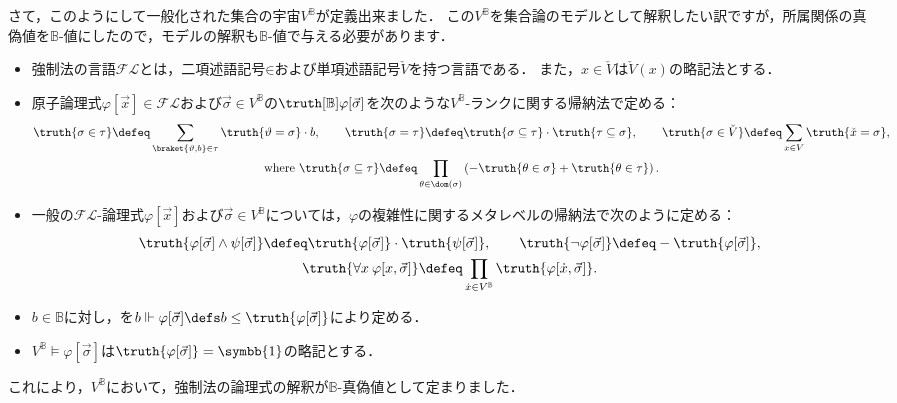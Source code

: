 \documentclass[a4j]{ltjsarticle}
\newcommand{\mathds}[1]{\symbb{#1}}
\renewcommand{\emph}[1]{\textbf{\textgt{#1}}}
\newcommand{\FL}{\mathord{\mathcal{F\!L}}}
\begin{document}
さて，このようにして一般化された集合の宇宙$V^{\mathbb{B}}$が定義出来ました．
この$V^{\mathbb{B}}$を集合論のモデルとして解釈したい訳ですが，所属関係の真偽値を$\mathbb{B}$-値にしたので，モデルの解釈も$\mathbb{B}$-値で与える必要があります．

\begin{definition}
 \begin{itemize}
  \item 強制法の言語$\FL$とは，二項述語記号$\mathord{\in}$および単項述語記号$\check{V}$を持つ言語である．
        また，$x \in \check{V}$は$\check{V}(x)$の略記法とする．
  \item 原子論理式$\varphi[\vec{x}] \in \FL$および$\vec{\sigma} \in V^{\mathbb{B}}$の\emph{真偽値}$\truth[\mathbb{B}]{\varphi[\vec{\sigma}]}$を次のような$V^{\mathbb{B}}$-ランクに関する帰納法で定める：
        \begin{gather*}
         \truth{\sigma \in \tau} \defeq \sum_{\braket{\vartheta, b} \in \tau} \truth{\vartheta = \sigma} \cdot b, \qquad
         \truth{\sigma = \tau} \defeq \truth{\sigma \subseteq \tau} \cdot \truth{\tau \subseteq \sigma},\qquad
         \truth{\sigma \in \check{V}} \defeq \sum_{x \in V} \truth{\check{x} = \sigma},\\
         \text{where }
         \truth{\sigma \subseteq \tau} \defeq \prod_{\theta \in \dom(\sigma)} \left(- \truth{\theta \in \sigma} + \truth{\theta \in \tau}\right).
        \end{gather*}
  \item 一般の$\FL$-論理式$\varphi[\vec{x}]$および$\vec{\sigma} \in V^{\mathbb{B}}$については，$\varphi$の複雑性に関するメタレベルの帰納法で次のように定める：
        \begin{gather*}
         \truth{\varphi[\vec{\sigma}] \wedge \psi[\vec{\sigma}] } \defeq \truth{\varphi[\vec{\sigma}]} \cdot \truth{\psi[\vec{\sigma}]}, \qquad
         \truth{\neg \varphi[\vec{\sigma}]} \defeq - \truth{\varphi[\vec{\sigma}]},\\
         \truth{\forall x \: \varphi[x, \vec{\sigma}]}
         \defeq \prod_{\dot{x} \in V^{\mathbb{B}}} \truth{\varphi[\dot{x}, \vec{\sigma}]}.
        \end{gather*}
  \item $b \in \mathbb{B}$に対し，\emph{強制関係}を$b \Vdash \varphi[\vec{\sigma}] \defs b \leq \truth{\varphi[\vec{\sigma}]}$により定める．
  \item $V^{\mathbb{B}} \models \varphi[\vec{\sigma}]$は$\truth{\varphi[\vec{\sigma}]} = \mathds{1}$の略記とする．
 \end{itemize}
\end{definition}
これにより，$V^{\mathbb{B}}$において，強制法の論理式の解釈が$\mathbb{B}$-真偽値として定まりました．
\end{document}
